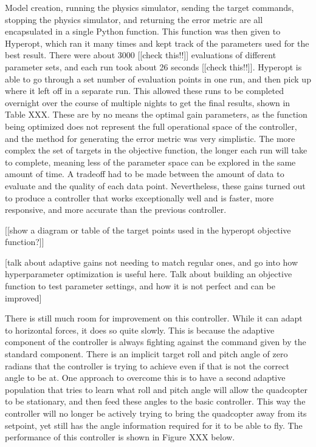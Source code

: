\documentclass[letterpaper,12pt,titlepage,oneside,final]{book}
\begin{document}
Model creation, running the physics simulator, sending the target commands, stopping the physics simulator, and returning the error metric are all encapsulated in a single Python function. This function was then given to Hyperopt, which ran it many times and kept track of the parameters used for the best result. There were about 3000 [[check this!!]] evaluations of different parameter sets, and each run took about 26 seconds [[check this!!]]. Hyperopt is able to go through a set number of evaluation points in one run, and then pick up where it left off in a separate run. This allowed these runs to be completed overnight over the course of multiple nights to get the final results, shown in Table XXX. These are by no means the optimal gain parameters, as the function being optimized does not represent the full operational space of the controller, and the method for generating the error metric was very simplistic. The more complex the set of targets in the objective function, the longer each run will take to complete, meaning less of the parameter space can be explored in the same amount of time. A tradeoff had to be made between the amount of data to evaluate and the quality of each data point. Nevertheless, these gains turned out to produce a controller that works exceptionally well and is faster, more responsive, and more accurate than the previous controller.

[[show a diagram or table of the target points used in the hyperopt objective function?]]

[talk about adaptive gains not needing to match regular ones, and go into how hyperparameter optimization is useful here. Talk about building an objective function to test parameter settings, and how it is not perfect and can be improved]

There is still much room for improvement on this controller. While it can adapt to horizontal forces, it does so quite slowly. This is because the adaptive component of the controller is always fighting against the command given by the standard component. There is an implicit target roll and pitch angle of zero radians that the controller is trying to achieve even if that is not the correct angle to be at. One approach to overcome this is to have a second adaptive population that tries to learn what roll and pitch angle will allow the quadcopter to be stationary, and then feed these angles to the basic controller. This way the controller will no longer be actively trying to bring the quadcopter away from its setpoint, yet still has the angle information required for it to be able to fly. The performance of this controller is shown in Figure XXX below.
\end{document}
